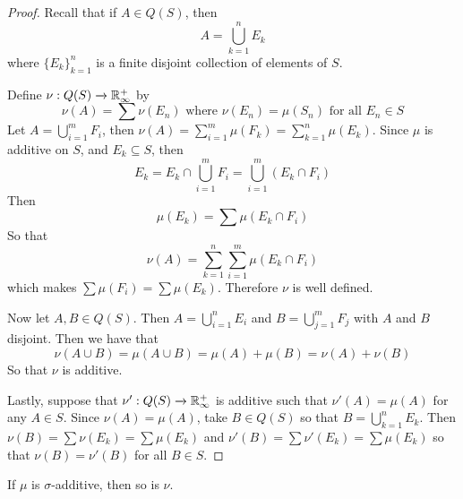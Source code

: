 \begin{proof}
    Recall that if $A \in Q(S)$, then
    \begin{equation*}
        A=\bigcup_{k=1}^n{E_k}
    \end{equation*}
    where $\{E_k\}_{k=1}^n$ is a finite disjoint collection of elements of $S$.

    Define  $\nu:Q(S) \xrightarrow{} \mathbb{R}^+_\infty$ by
    \begin{equation*}
        \nu(A)=\sum{\nu(E_n)} \text{ where } \nu(E_n)=\mu(S_n) \text{ for all }
        E_n \in S
    \end{equation*}
    Let $A=\bigcup_{i=1}^m{F_i}$, then
    $\nu(A)=\sum_{i=1}^m{\mu(F_k)}=\sum_{k=1}^n{\mu(E_k)}$. Since $\mu$ is
    additive on $S$, and $E_k \subseteq S$, then
    \begin{equation*}
        E_k=E_k \cap \bigcup_{i=1}^m{F_i}=\bigcup_{i=1}^m{(E_k \cap F_i)}
    \end{equation*}
    Then
    \begin{equation*}
        \mu(E_k)=\sum{\mu(E_k \cap F_i)}
    \end{equation*}
    So that
    \begin{equation*}
        \nu(A)=\sum_{k=1}^n{\sum_{i=1}^m{\mu(E_k \cap F_i)}}
    \end{equation*}
    which makes $\sum{\mu(F_i)}=\sum{\mu(E_k)}$. Therefore $\nu$ is well
    defined.

    Now let  $A,B \in Q(S)$. Then $A=\bigcup_{i=1}^n{E_i}$ and
    $B=\bigcup_{j=1}^m{F_j}$ with $A$ and $B$ disjoint. Then we have that
    \begin{equation*}
        \nu(A \cup B)=\mu(A \cup B)=\mu(A)+\mu(B)=\nu(A)+\nu(B)
    \end{equation*}
    So that $\nu$ is additive.

    Lastly, suppose that  $\nu':Q(S) \xrightarrow{} \mathbb{R}^+_\infty$ is additive
    such that $\nu'(A)=\mu(A)$ for any $A \in S$. Since  $\nu(A)=\mu(A)$, take
    $B \in Q(S)$ so that $B=\bigcup_{k=1}^n{E_k}$. Then
    $\nu(B)=\sum{\nu(E_k)}=\sum{\mu(E_k)}$ and
    $\nu'(B)=\sum{\nu'(E_k)}=\sum{\mu(E_k)}$ so that $\nu(B)=\nu'(B)$ for all $B
    \in S$.
\end{proof}
\begin{corollary}
    If $\mu$ is  $\sigma$-additive, then so is  $\nu$.
\end{corollary}
